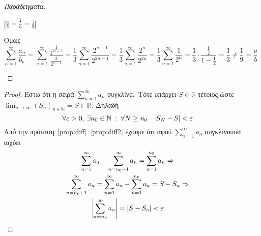 \begin{rem}
\begin{proof}[Παράδειγματα]
\begin{enumerate}[i)]
                [$ \frac{a}{b} = \frac{\frac{2}{3}}{6} = \frac{1}{9} $]

                Όμως 
                \[
                    \sum_{n=1}^{\infty} \frac{a_{n}}{b_{n}} = \sum_{n=1}^{\infty} 
                    \frac{\frac{1}{2^{2n-1}}}{\frac{3}{2^{n-1}}} = 
                    \frac{1}{3} \sum_{n=1}^{\infty} \frac{2^{n-1}}{2^{2n-1}} = 
                    \frac{1}{3} \sum_{n=1}^{\infty} \frac{2^{n}}{2^{2n}} = 
                    \frac{1}{3} \sum_{n=1}^{\infty} \frac{1}{2^{n}} = \frac{1}{3} \cdot 
                    \frac{\frac{1}{2}}{1 - \frac{1}{2}} = \frac{1}{3} \neq \frac{1}{9} 
                    = \frac{a}{b}
                \] 
        \end{enumerate}

    \end{proof}
\end{rem}


\begin{proof}
\item {}
    Έστω ότι η σειρά $ \sum_{n=1}^{\infty} a_{n} $ συγκλίνει. Τότε υπάρχει 
    $ S \in \mathbb{R} $ τέτοιος ώστε $ \lim_{n \to \infty} 
    {(S_{n})}_{n \in \mathbb{N}} = S \in \mathbb{R} $. Δηλαδή 
    \[
        \forall \varepsilon >0, \; \exists n_{0} \in \mathbb{N} \; : \; 
        \forall N \geq n_{0} \quad \abs{S_{N}-S} < \varepsilon 
    \] 
    Από την πρόταση~\ref{prop:diff}~\ref{prop:diff2} έχουμε ότι αφού 
    $ \sum_{n=1}^{\infty} a_{n} $ συγκλίνουσα ισχύει
    \begin{gather*}
        \sum_{n=1}^{\infty} a_{n} - \sum_{n= n_{0}+1}^{\infty} a_{n} = 
        \sum_{n= 1}^{n_{0}} a_{n} \Rightarrow \\ 
        \sum_{n= n_{0}+1}^{\infty} a_{n} = \sum_{n=1}^{\infty} a_{n} - 
        \sum_{n=1}^{n_{0}} a_{n} = S - S_{n} \Rightarrow \\
        \abs{\sum_{n= n_{0}}^{\infty} a_{n}} = \abs{S - S_{n}} < \varepsilon
    \end{gather*} 
\end{proof}


